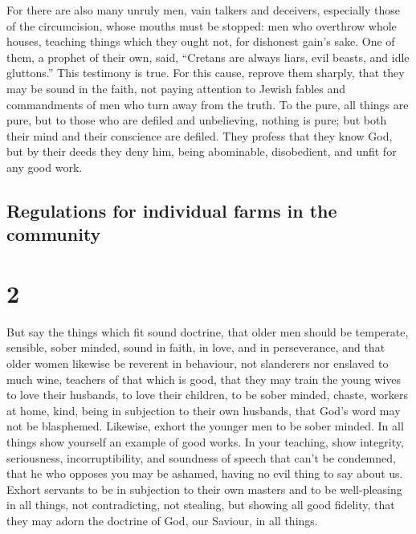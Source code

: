  For there are also many unruly men, vain talkers and
deceivers, especially those of the circumcision,  whose
mouths must be stopped: men who overthrow whole houses, teaching things
which they ought not, for dishonest gain's sake.  One of
them, a prophet of their own, said, ``Cretans are always liars, evil
beasts, and idle gluttons.''  This testimony is true. For
this cause, reprove them sharply, that they may be sound in the faith,
 not paying attention to Jewish fables and commandments
of men who turn away from the truth.  To the pure, all
things are pure, but to those who are defiled and unbelieving, nothing
is pure; but both their mind and their conscience are defiled.
 They profess that they know God, but by their deeds they
deny him, being abominable, disobedient, and unfit for any good work.

\hypertarget{regulations-for-individual-farms-in-the-community}{%
\subsection{Regulations for individual farms in the
community}\label{regulations-for-individual-farms-in-the-community}}

\hypertarget{section-1}{%
\section{2}\label{section-1}}

 But say the things which fit sound doctrine,
 that older men should be temperate, sensible, sober
minded, sound in faith, in love, and in perseverance,  and
that older women likewise be reverent in behaviour, not slanderers nor
enslaved to much wine, teachers of that which is good, 
that they may train the young wives to love their husbands, to love
their children,  to be sober minded, chaste, workers at
home, kind, being in subjection to their own husbands, that God's word
may not be blasphemed.  Likewise, exhort the younger men
to be sober minded.  In all things show yourself an
example of good works. In your teaching, show integrity, seriousness,
incorruptibility,  and soundness of speech that can't be
condemned, that he who opposes you may be ashamed, having no evil thing
to say about us.  Exhort servants to be in subjection to
their own masters and to be well-pleasing in all things, not
contradicting,  not stealing, but showing all good
fidelity, that they may adorn the doctrine of God, our Saviour, in all
things.

